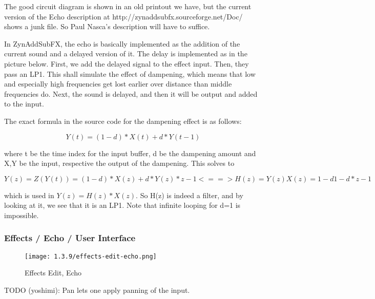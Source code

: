    The good circuit diagram is shown in an old printout we have, but the
   current version of the Echo description at
   http://zynaddsubfx.sourceforge.net/Doc/ shows a
   junk file.  So Paul Nasca's description will have to suffice.


   In ZynAddSubFX, the echo is basically implemented as the addition of the
   current sound and a delayed version of it. The delay is implemented as in
   the picture below. First, we add the delayed signal to the effect input.
   Then, they pass an LP1. This shall simulate the effect of dampening, which
   means that low and especially high frequencies get lost earlier over
   distance than middle frequencies do. Next, the sound is delayed, and then
   it will be output and added to the input.

   The exact formula in the source code for the dampening effect is as
   follows:

   \[Y(t)=(1-d)*X(t)+d*Y(t-1)\]

   where t be the time index for the input buffer, d be the dampening amount
   and X,Y be the input, respective the output of the dampening. This solves
   to

   \[Y(z)=Z(Y(t))=(1-d)*X(z)+d*Y(z)*z-1 <==> H(z)=Y(z)X(z)=1-d1-d*z-1\]

   which is used in \(Y(z)=H(z)*X(z)\). So H(z) is indeed a filter, and by
   looking at it, we see that it is an LP1. Note that infinite looping for
   d=1 is impossible.

\subsubsection{Effects / Echo / User Interface}
\label{subsubsec:effects_edit_echo_ui}

\begin{figure}[H]
   \centering
   \texttt{[image: 1.3.9/effects-edit-echo.png]}
   \caption{Effects Edit, Echo}
   \label{fig:effects_edit_echo}
\end{figure}

   TODO (yoshimi):  Pan lets one apply panning of the input.

